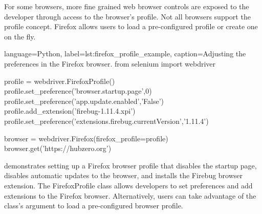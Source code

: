 %


For some browsers, more fine grained web browser controls are exposed to the
developer through access to the browser's profile.  Not all browsers support the
profile concept. Firefox allows users to load a pre-configured profile or
create one on the fly.

\begin{xcode}{%
  language=Python,%
  label=lst:firefox_profile_example,%
  caption={Adjusting the preferences in the Firefox browser.}%
}
from selenium import webdriver

profile = webdriver.FirefoxProfile()
profile.set_preference('browser.startup.page',0)
profile.set_preference('app.update.enabled','False')
profile.add_extension('firebug-1.11.4.xpi')
profile.set_preference('extensions.firebug.currentVersion','1.11.4')

browser = webdriver.Firefox(firefox_profile=profile)
browser.get('https://hubzero.org')
\end{xcode}

 demonstrates setting up a Firefox
browser profile that disables the startup page, disables automatic updates to
the browser, and installs the Firebug browser extension.  The FirefoxProfile
class allows developers to set preferences and add extensions to the Firefox
browser. Alternatively, users can take advantage of the class's
 argument to load a pre-configured browser
profile.

